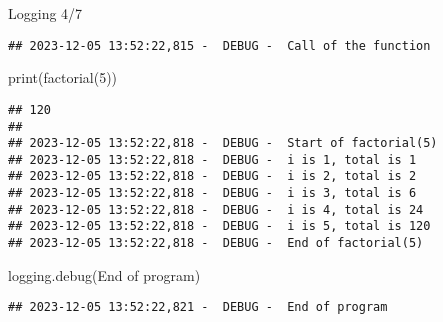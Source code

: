 \documentclass[
  8pt,
  ignorenonframetext,
]{beamer}
\newenvironment{Shaded}{\begin{snugshade}}{\end{snugshade}}
\newcommand{\BuiltInTok}[1]{#1}
\newcommand{\DecValTok}[1]{\textcolor[rgb]{0.00,0.00,0.81}{#1}}
\newcommand{\NormalTok}[1]{#1}
\newcommand{\StringTok}[1]{\textcolor[rgb]{0.31,0.60,0.02}{#1}}
\begin{document}
\begin{frame}[fragile]{Logging 4/7}
\begin{verbatim}
## 2023-12-05 13:52:22,815 -  DEBUG -  Call of the function
\end{verbatim}

\begin{Shaded}
\begin{Highlighting}[]
\BuiltInTok{print}\NormalTok{(factorial(}\DecValTok{5}\NormalTok{))}
\end{Highlighting}
\end{Shaded}

\begin{verbatim}
## 120
## 
## 2023-12-05 13:52:22,818 -  DEBUG -  Start of factorial(5)
## 2023-12-05 13:52:22,818 -  DEBUG -  i is 1, total is 1
## 2023-12-05 13:52:22,818 -  DEBUG -  i is 2, total is 2
## 2023-12-05 13:52:22,818 -  DEBUG -  i is 3, total is 6
## 2023-12-05 13:52:22,818 -  DEBUG -  i is 4, total is 24
## 2023-12-05 13:52:22,818 -  DEBUG -  i is 5, total is 120
## 2023-12-05 13:52:22,818 -  DEBUG -  End of factorial(5)
\end{verbatim}

\begin{Shaded}
\begin{Highlighting}[]
\NormalTok{logging.debug(}\StringTok{\textquotesingle{}End of program\textquotesingle{}}\NormalTok{)}
\end{Highlighting}
\end{Shaded}

\begin{verbatim}
## 2023-12-05 13:52:22,821 -  DEBUG -  End of program
\end{verbatim}
\end{frame}
\end{document}
